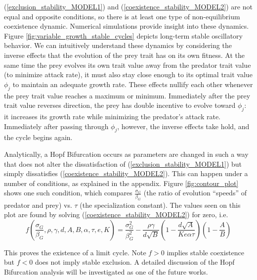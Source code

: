 \documentclass{amsart}
\theoremstyle{definition}
\theoremstyle{remark}
\numberwithin{equation}{section}
\begin{document}
(\ref{exclusion_stability_MODEL1}) and (\ref{coexistence_stability_MODEL2}) are not equal and opposite conditions, so there is at least one type of non-equilibrium coexistence dynamic.  Numerical simulations provide insight into these dynamics.  Figure \ref{fig:variable_growth_stable_cycles} depicts long-term stable oscillatory behavior.  We can intuitively understand these dynamics by considering the inverse effects that the evolution of the prey trait has on its own fitness.  At the same time the prey evolves its own trait value away from the predator trait value (to minimize attack rate), it must also stay close enough to its optimal trait value $\phi_j$ to maintain an adequate growth rate.  These effects nullify each other whenever the prey trait value reaches a maximum or minimum.  Immediately after the prey trait value reverses direction, the prey has double incentive to evolve toward $\phi_j$: it increases its growth rate while minimizing the predator's attack rate.  Immediately after passing through $\phi_j$, however, the inverse effects take hold, and the cycle begins again.

Analytically, a Hopf Bifurcation occurs as parameters are changed in such a way that does not alter the dissatisfaction of (\ref{exclusion_stability_MODEL1}) but simply dissatisfies (\ref{coexistence_stability_MODEL2}).  This can happen under a number of conditions, as explained in the appendix.  Figure \ref{fig:contour_plot} shows one such condition, which compares $\frac{\sigma_G}{\beta_G}$ (the ratio of evolution ``speeds'' of predator and prey) vs. $\tau$ (the specialization constant).  The values seen on this plot are found by solving (\ref{coexistence_stability_MODEL2}) for zero, i.e.
\begin{equation}
	f\left(\frac{\sigma_G}{\beta_G}, \rho, \gamma, d, A, B, \alpha, \tau, e, K\right) = \frac{\sigma_G^2}{\beta_G^2} - \frac{\rho\gamma}{d\sqrt{B}}\left(1 - \frac{d\sqrt{A}}{Ke\alpha\tau}\right)\left(1 - \frac{A}{B}\right)
\end{equation}

This proves the existence of a limit cycle.  Note $f > 0$ implies stable coexistence but $f < 0$ does not imply stable exclusion.  A detailed discussion of the Hopf Bifurcation analysis will be investigated as one of the future works.
\end{document}
